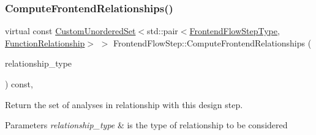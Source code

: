 \subsubsection{\texorpdfstring{Compute\+Frontend\+Relationships()}{ComputeFrontendRelationships()}}
{\footnotesize\ttfamily virtual const \hyperlink{classCustomUnorderedSet}{Custom\+Unordered\+Set}$<$std\+::pair$<$\hyperlink{frontend__flow__step_8hpp_afeb3716c693d2b2e4ed3e6d04c3b63bb}{Frontend\+Flow\+Step\+Type}, \hyperlink{classFrontendFlowStep_af7cf30f2023e5b99e637dc2058289ab0}{Function\+Relationship}$>$ $>$ Frontend\+Flow\+Step\+::\+Compute\+Frontend\+Relationships (\begin{DoxyParamCaption}\item[{const \hyperlink{classDesignFlowStep_a723a3baf19ff2ceb77bc13e099d0b1b7}{Design\+Flow\+Step\+::\+Relationship\+Type}}]{relationship\+\_\+type }\end{DoxyParamCaption}) const\hspace{0.3cm}{\ttfamily [protected]}, {}}



Return the set of analyses in relationship with this design step. 


\begin{DoxyParams}{Parameters}
{\em relationship\+\_\+type} & is the type of relationship to be considered \\
\hline
\end{DoxyParams}


